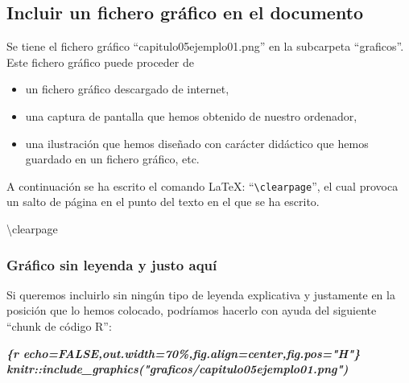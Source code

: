 \documentclass[12pt,a4paper,oneside,]{book}
\newenvironment{Shaded}{\begin{snugshade}}{\end{snugshade}}
\newcommand{\InformationTok}[1]{\textcolor[rgb]{0.56,0.35,0.01}{\textbf{\textit{#1}}}}
\newcommand{\NormalTok}[1]{#1}
\providecommand{\tightlist}{%
  \setlength{\itemsep}{0pt}\setlength{\parskip}{0pt}}
\numberwithin{dummy}{section}
\theoremstyle{ocrenumbox}
\theoremstyle{blacknumex}
\theoremstyle{blacknumbox}
\theoremstyle{ocrenum}
\theoremstyle{ocrenum}
\begin{document}
\hypertarget{incluir-un-fichero-gruxe1fico-en-el-documento}{%
\subsection{Incluir un fichero gráfico en el
documento}\label{incluir-un-fichero-gruxe1fico-en-el-documento}}

Se tiene el fichero gráfico ``capitulo05ejemplo01.png'' en la subcarpeta
``graficos''. Este fichero gráfico puede proceder de

\begin{itemize}
\tightlist
\item
  un fichero gráfico descargado de internet,
\item
  una captura de pantalla que hemos obtenido de nuestro ordenador,
\item
  una ilustración que hemos diseñado con carácter didáctico que hemos
  guardado en un fichero gráfico, etc.
\end{itemize}

A continuación se ha escrito el comando LaTeX:
``\texttt{\textbackslash{}clearpage}'', el cual provoca un salto de
página en el punto del texto en el que se ha escrito.

\begin{Shaded}
\begin{Highlighting}[]
\NormalTok{\textbackslash{}clearpage}
\end{Highlighting}
\end{Shaded}

\clearpage

\hypertarget{gruxe1fico-sin-leyenda-y-justo-aquuxed}{%
\subsubsection{Gráfico sin leyenda y justo
aquí}\label{gruxe1fico-sin-leyenda-y-justo-aquuxed}}

Si queremos incluirlo sin ningún tipo de leyenda explicativa y
justamente en la posición que lo hemos colocado, podríamos hacerlo con
ayuda del siguiente ``chunk de código R'':

\begin{Shaded}
\begin{Highlighting}[]
\InformationTok{\textasciigrave{}\textasciigrave{}\textasciigrave{}\{r echo=FALSE,out.width=\textquotesingle{}70\%\textquotesingle{},fig.align=\textquotesingle{}center\textquotesingle{},fig.pos="H"\}}
\InformationTok{knitr::include\_graphics("graficos/capitulo05ejemplo01.png")}
\InformationTok{\textasciigrave{}\textasciigrave{}\textasciigrave{}}
\end{Highlighting}
\end{Shaded}
\end{document}
